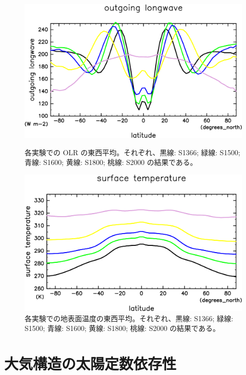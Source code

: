 \documentclass[body]{subfiles}
\begin{document}
\begin{figure}[t]
	\centering
	\begin{minipage}{.45\textwidth}
		\centering
		\includegraphics[width=\textwidth]{OLR-overplot-crop-rotate.pdf}
		\caption[各実験での OLR の東西平均]{
			各実験での OLR の東西平均。それぞれ、黒線: S1366;
			緑線: S1500; 青線: S1600; 黄線: S1800; 桃線: S2000 の結果である。
		}\label{OLR東西平均}
	\end{minipage}
	\hfill
	\begin{minipage}{.45\textwidth}
		\centering
		\includegraphics[width=\textwidth]{SurfTemp-overplot-crop-rotate.pdf}
		\caption[各実験での地表面温度の東西平均]{
			各実験での地表面温度の東西平均。それぞれ、黒線: S1366;
			緑線: S1500; 青線: S1600; 黄線: S1800; 桃線: S2000 の結果である。
		}\label{地表面温度}
	\end{minipage}
\end{figure}

\section{大気構造の太陽定数依存性}
\end{document}
